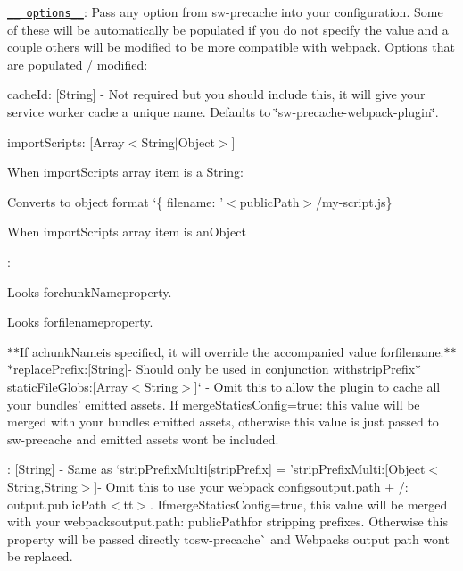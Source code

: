 \href{https://github.com/GoogleChrome/sw-precache#options-parameter}{\tt \+\_\+\+\_ options\+\_\+\+\_\+}\+: Pass any option from {\ttfamily sw-\/precache} into your configuration. Some of these will be automatically be populated if you do not specify the value and a couple others will be modified to be more compatible with webpack. Options that are populated / modified\+:


\begin{DoxyItemize}
\item {\ttfamily cache\+Id}\+: {\ttfamily \mbox{[}String\mbox{]}} -\/ Not required but you should include this, it will give your service worker cache a unique name. Defaults to \char`\"{}sw-\/precache-\/webpack-\/plugin\char`\"{}.
\item {\ttfamily import\+Scripts}\+: {\ttfamily \mbox{[}Array$<$String$\vert$\+Object$>$\mbox{]}}
\begin{DoxyItemize}
\item When import\+Scripts array item is a {\ttfamily String}\+:
\begin{DoxyItemize}
\item Converts to object format `\{ filename\+: '$<$public\+Path$>$/my-\/script.js\textquotesingle{}\}{\ttfamily }
\end{DoxyItemize}
\item {\ttfamily When import\+Scripts array item is an}Object{\ttfamily \+:
\begin{DoxyItemize}
\item Looks forchunk\+Name{\ttfamily property.}
\item {\ttfamily Looks for}filename{\ttfamily property.}
\item {\ttfamily $\ast$$\ast$\+If a}chunk\+Name{\ttfamily is specified, it will override the accompanied value for}filename{\ttfamily .$\ast$$\ast$ $\ast$}replace\+Prefix{\ttfamily \+:}\mbox{[}String\mbox{]}{\ttfamily -\/ Should only be used in conjunction with}strip\+Prefix{\ttfamily  $\ast$}static\+File\+Globs{\ttfamily \+:}\mbox{[}Array$<$\+String$>$\mbox{]}` -\/ Omit this to allow the plugin to cache all your bundles' emitted assets. If {\ttfamily merge\+Statics\+Config=true}\+: this value will be merged with your bundles\textquotesingle{} emitted assets, otherwise this value is just passed to {\ttfamily sw-\/precache} and emitted assets won\textquotesingle{}t be included.
\end{DoxyItemize}}
\end{DoxyItemize}
\item {\+: {\ttfamily \mbox{[}String\mbox{]}} -\/ Same as `strip\+Prefix\+Multi\mbox{[}strip\+Prefix\mbox{]} = '\textquotesingle{}{\ttfamily  $\ast$}strip\+Prefix\+Multi{\ttfamily \+:}\mbox{[}Object$<$\+String,\+String$>$\mbox{]}{\ttfamily -\/ Omit this to use your webpack config\textquotesingle{}s}output.\+path + \textquotesingle{}/\textquotesingle{}\+: output.\+public\+Path$<$tt$>$. If}merge\+Statics\+Config=true{\ttfamily , this value will be merged with your webpack\textquotesingle{}s}output.\+path\+: public\+Path{\ttfamily for stripping prefixes. Otherwise this property will be passed directly to}sw-\/precache\`{} and Webpack\textquotesingle{}s output path won\textquotesingle{}t be replaced.

\end{DoxyItemize}

